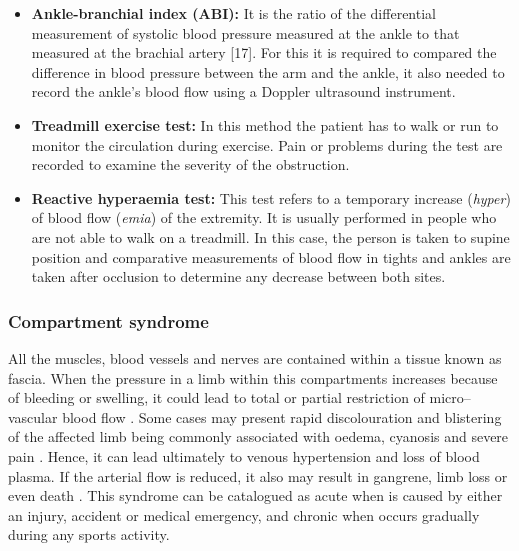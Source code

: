 \begin{itemize}
    \item \textbf{Ankle-branchial index (ABI):} It is the ratio of the differential measurement of systolic blood pressure measured at the ankle to that measured at the brachial artery [17]. For this it is required to compared the difference in blood pressure between the arm and the ankle, it also needed to record the ankle's blood flow using a Doppler ultrasound instrument.  
    \item \textbf{Treadmill exercise test: }In this method the patient has to walk or run to monitor the circulation during exercise. Pain or problems during the test are recorded to examine the severity of the obstruction.
    \item \textbf{Reactive hyperaemia test:} This test refers to a temporary increase (\textit{hyper}) of blood flow (\textit{emia}) of the extremity. It is usually performed in people who are not able to walk on a treadmill. In this case, the person is taken to supine position and comparative measurements of blood flow in tights and ankles are taken after occlusion to determine any decrease between both sites. 
\end{itemize}

\subsubsection{Compartment syndrome}
\label{section literature 2.2}                                                                                                                                                                                                                                                                                                                                                                                                                                                                                                                                                                                                                     
All the muscles, blood vessels and nerves are contained within a tissue known as fascia. When the pressure in a limb within this compartments increases because of bleeding or swelling, it could lead to total or partial restriction of micro–vascular blood flow \cite{songer2001tissue}. Some cases may present rapid discolouration and blistering of the affected limb being commonly associated with oedema, cyanosis and severe pain \cite{chhabra2013compartment}. Hence, it can lead ultimately to venous hypertension and loss of blood plasma. If the arterial flow is reduced, it also may result in gangrene, limb loss or even death \cite{lamborn2014compartment}. This syndrome can be catalogued as acute when is caused by either an injury, accident or medical emergency, and chronic when occurs gradually during any sports activity.


